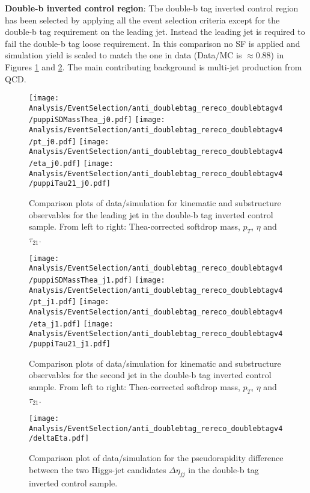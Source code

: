 \noindent
\textbf{Double-b inverted control region}:
The double-b tag inverted control region has been selected by applying all the event selection criteria except for the double-b tag requirement on the leading jet. Instead the leading jet is required to fail the double-b tag loose requirement.
In this comparison no SF is applied and simulation yield is scaled to match the one in data (Data/MC is $\approx 0.88$) in Figures \ref{fig:jet1_double-b_tag_inverted} and \ref{fig:jet2_double-b_tag_inverted}. The main contributing background is multi-jet production from QCD.

\begin{figure}[H]
\centering
\texttt{[image: Analysis/EventSelection/anti\_doublebtag\_rereco\_doublebtagv4/puppiSDMassThea\_j0.pdf]}
\texttt{[image: Analysis/EventSelection/anti\_doublebtag\_rereco\_doublebtagv4/pt\_j0.pdf]}
\texttt{[image: Analysis/EventSelection/anti\_doublebtag\_rereco\_doublebtagv4/eta\_j0.pdf]}
\texttt{[image: Analysis/EventSelection/anti\_doublebtag\_rereco\_doublebtagv4/puppiTau21\_j0.pdf]}
\caption{ Comparison plots of data/simulation for kinematic and substructure observables for the leading jet in the double-b tag inverted control sample. From left to right: Thea-corrected softdrop mass, $p_{T}$, $\eta$ and $\tau_{21}$.}
\label{fig:jet1_double-b_tag_inverted}
\end{figure}

\begin{figure}[H]
\centering
\texttt{[image: Analysis/EventSelection/anti\_doublebtag\_rereco\_doublebtagv4/puppiSDMassThea\_j1.pdf]}
\texttt{[image: Analysis/EventSelection/anti\_doublebtag\_rereco\_doublebtagv4/pt\_j1.pdf]}
\texttt{[image: Analysis/EventSelection/anti\_doublebtag\_rereco\_doublebtagv4/eta\_j1.pdf]}
\texttt{[image: Analysis/EventSelection/anti\_doublebtag\_rereco\_doublebtagv4/puppiTau21\_j1.pdf]}
\caption{ Comparison plots of data/simulation for kinematic and substructure observables for the second jet in the double-b tag inverted control sample. From left to right: Thea-corrected softdrop mass, $p_{T}$, $\eta$ and $\tau_{21}$.}
\label{fig:jet2_double-b_tag_inverted}
\end{figure}

\begin{figure}[H]
\centering
\texttt{[image: Analysis/EventSelection/anti\_doublebtag\_rereco\_doublebtagv4/deltaEta.pdf]}
\caption{ Comparison plot of data/simulation for the pseudorapidity difference between the two Higgs-jet candidates $\Delta\eta_{jj}$ in the double-b tag inverted control sample.}
\label{fig:deta_double-b_tag_inverted}
\end{figure}

